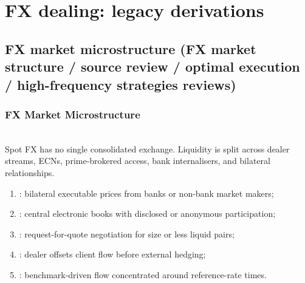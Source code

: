 \documentclass[a4paper,oneside,openany]{book}
\begin{document}
\chapter*{FX dealing: legacy derivations}

\section*{FX market microstructure (FX market structure / source review / optimal execution / high-frequency strategies reviews)}

\subsection*{FX Market Microstructure}

\begin{principle} \\
Spot FX has no single consolidated exchange. Liquidity is split across dealer streams, ECNs, prime-brokered access, bank internalisers, and bilateral relationships.
\end{principle}

\begin{taxonomy} 
\begin{enumerate}[label=\roman*.]
\setlength{\itemsep}{0pt}
\item {}: bilateral executable prices from banks or non-bank market makers;
\item {}: central electronic books with disclosed or anonymous participation;
\item {}: request-for-quote negotiation for size or less liquid pairs;
\item {}: dealer offsets client flow before external hedging;
\item {}: benchmark-driven flow concentrated around reference-rate times.
\end{enumerate}
\end{taxonomy}
\end{document}
